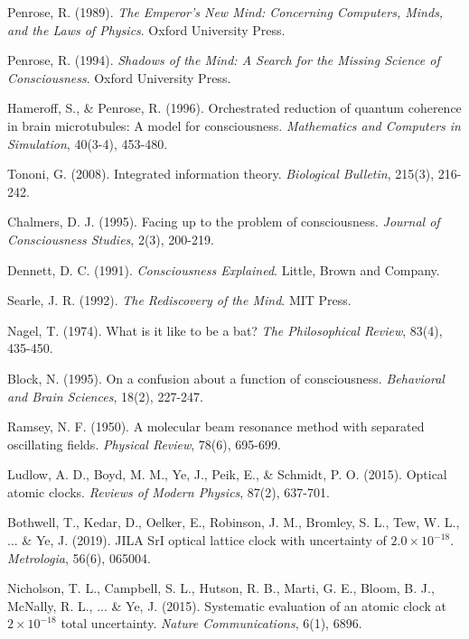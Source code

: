 \documentclass[12pt,a4paper]{article}
\begin{document}
\begin{thebibliography}{99}
Penrose, R. (1989). \textit{The Emperor's New Mind: Concerning Computers, Minds, and the Laws of Physics}. Oxford University Press.

Penrose, R. (1994). \textit{Shadows of the Mind: A Search for the Missing Science of Consciousness}. Oxford University Press.

Hameroff, S., \& Penrose, R. (1996). Orchestrated reduction of quantum coherence in brain microtubules: A model for consciousness. \textit{Mathematics and Computers in Simulation}, 40(3-4), 453-480.

Tononi, G. (2008). Integrated information theory. \textit{Biological Bulletin}, 215(3), 216-242.

Chalmers, D. J. (1995). Facing up to the problem of consciousness. \textit{Journal of Consciousness Studies}, 2(3), 200-219.

Dennett, D. C. (1991). \textit{Consciousness Explained}. Little, Brown and Company.

Searle, J. R. (1992). \textit{The Rediscovery of the Mind}. MIT Press.

Nagel, T. (1974). What is it like to be a bat? \textit{The Philosophical Review}, 83(4), 435-450.

Block, N. (1995). On a confusion about a function of consciousness. \textit{Behavioral and Brain Sciences}, 18(2), 227-247.

Ramsey, N. F. (1950). A molecular beam resonance method with separated oscillating fields. \textit{Physical Review}, 78(6), 695-699.

Ludlow, A. D., Boyd, M. M., Ye, J., Peik, E., \& Schmidt, P. O. (2015). Optical atomic clocks. \textit{Reviews of Modern Physics}, 87(2), 637-701.

Bothwell, T., Kedar, D., Oelker, E., Robinson, J. M., Bromley, S. L., Tew, W. L., ... \& Ye, J. (2019). JILA SrI optical lattice clock with uncertainty of $2.0 \times 10^{-18}$. \textit{Metrologia}, 56(6), 065004.

Nicholson, T. L., Campbell, S. L., Hutson, R. B., Marti, G. E., Bloom, B. J., McNally, R. L., ... \& Ye, J. (2015). Systematic evaluation of an atomic clock at $2 \times 10^{-18}$ total uncertainty. \textit{Nature Communications}, 6(1), 6896.


\end{thebibliography}
\end{document}

